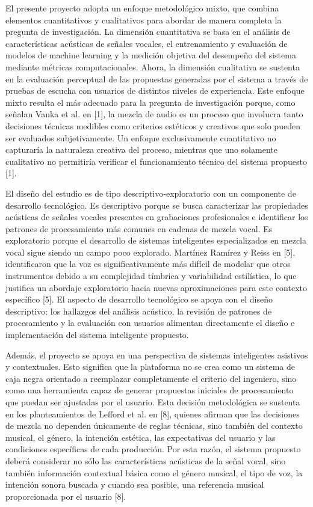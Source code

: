 \documentclass[12pt]{article}
\begin{document}
El presente proyecto adopta un enfoque metodológico mixto, que combina elementos cuantitativos y cualitativos para abordar de manera completa la pregunta de investigación. La dimensión cuantitativa se basa en el análisis de características acústicas de señales vocales, el entrenamiento y evaluación de modelos de machine learning y la medición objetiva del desempeño del sistema mediante métricas computacionales. Ahora, la dimensión cualitativa se sustenta en la evaluación perceptual de las propuestas generadas por el sistema a través de pruebas de escucha con usuarios de distintos niveles de experiencia. Este enfoque mixto resulta el más adecuado para la pregunta de investigación porque, como señalan Vanka et al. en [1], la mezcla de audio es un proceso que involucra tanto decisiones técnicas medibles como criterios estéticos y creativos que solo pueden ser evaluados subjetivamente. Un enfoque exclusivamente cuantitativo no capturaría la naturaleza creativa del proceso, mientras que uno solamente cualitativo no permitiría verificar el funcionamiento técnico del sistema propuesto [1].

El diseño del estudio es de tipo descriptivo-exploratorio con un componente de desarrollo tecnológico. Es descriptivo porque se busca caracterizar las propiedades acústicas de señales vocales presentes en grabaciones profesionales e identificar los patrones de procesamiento más comunes en cadenas de mezcla vocal. Es exploratorio porque el desarrollo de sistemas inteligentes especializados en mezcla vocal sigue siendo un campo poco explorado. Martínez Ramírez y Reiss en [5], identificaron que la voz es significativamente más difícil de modelar que otros instrumentos debido a su complejidad tímbrica y variabilidad estilística, lo que justifica un abordaje exploratorio hacia nuevas aproximaciones para este contexto específico [5]. El aspecto de desarrollo tecnológico se apoya con el diseño descriptivo: los hallazgos del análisis acústico, la revisión de patrones de procesamiento y la evaluación con usuarios alimentan directamente el diseño e implementación del sistema inteligente propuesto.

Además, el proyecto se apoya en una perspectiva de sistemas inteligentes asistivos y contextuales. Esto significa que la plataforma no se crea como un sistema de caja negra orientado a reemplazar completamente el criterio del ingeniero, sino como una herramienta capaz de generar propuestas iniciales de procesamiento que puedan ser ajustadas por el usuario. Esta decisión metodológica se sustenta en los planteamientos de Lefford et al. en [8], quienes afirman que las decisiones de mezcla no dependen únicamente de reglas técnicas, sino también del contexto musical, el género, la intención estética, las expectativas del usuario y las condiciones específicas de cada producción. Por esta razón, el sistema propuesto deberá considerar no sólo las características acústicas de la señal vocal, sino también información contextual básica como el género musical, el tipo de voz, la intención sonora buscada y cuando sea posible, una referencia musical proporcionada por el usuario [8].
\end{document}
